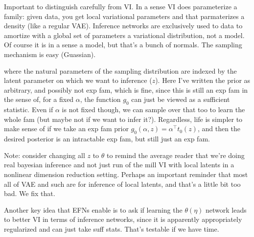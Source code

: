 \documentclass{article}
\begin{document}
 Important to distinguish carefully from VI.  In a sense VI does parameterize a family: given data, you get local variational parameters and that parmaterizes a density (like a regular VAE).  Inference networks are exclusively used to data to amortize with a global set of parameters a variational distribution, not a model.  Of course it is in a sense a model, but that's a bunch of normals.  The sampling mechanism is easy (Guassian).  
 
 where the natural parameters of the sampling distribution are indexed by the latent parameter on which we want to inference ($z$).  Here I've written the prior as arbitrary, and possibly not exp fam, which is fine, since this is still an exp fam in the  sense of, for a fixed $\alpha$, the function $g_0$ can just be viewed as a sufficient statistic.  Even if $\alpha$ is not fixed though, we can sample over that too to learn the whole fam (but maybe not if we want to infer it?).  Regardless, life is simpler to make sense of if we take an exp fam prior $g_0(\alpha,z) = \alpha^\top t_0(z)$, and then the desired posterior is an intractable exp fam, but still just an exp fam.
 
 Note: consider changing all $z$ to $\theta$ to remind the average reader that we're doing real bayesian inference and not just run of the mill VI with local latents in a nonlinear dimension reduction setting.  Perhaps an important reminder that most all of VAE and such are for inference of local latents, and that's a little bit too bad.  We fix that.

Another key  idea that EFNs enable is to ask if learning the $\theta(\eta)$ network leads to better VI in terms of inference networks, since it is apparently appropriately regularized and can just take suff stats.  That's testable if we have time.
\end{document}
